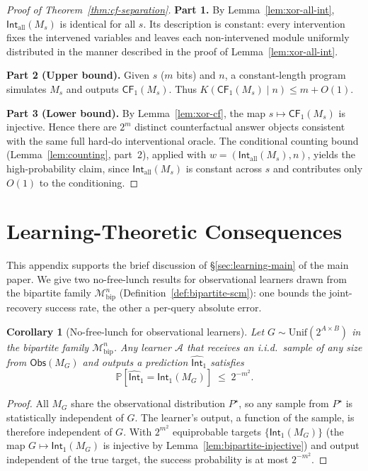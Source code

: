 \documentclass{article}
\theoremstyle{plain}
\newtheorem{corollary}[theorem]{Corollary}
\theoremstyle{definition}
\newcommand{\Prob}{\mathbb{P}}
\newcommand{\calM}{\mathcal{M}}
\newcommand{\calA}{\mathcal{A}}
\newcommand{\Obs}{\mathsf{Obs}}
\newcommand{\Int}{\mathsf{Int}}
\newcommand{\CF}{\mathsf{CF}}
\begin{document}
\begin{proof}[Proof of Theorem~\ref{thm:cf-separation}]
\textbf{Part 1.} By Lemma~\ref{lem:xor-all-int}, $\Int_{\mathrm{all}}(M_s)$ is identical for all $s$. Its description is constant: every intervention fixes the intervened variables and leaves each non-intervened module uniformly distributed in the manner described in the proof of Lemma~\ref{lem:xor-all-int}.

\textbf{Part 2 (Upper bound).} Given $s$ ($m$ bits) and $n$, a constant-length program simulates $M_s$ and outputs $\CF_1(M_s)$. Thus $K(\CF_1(M_s) \mid n) \leq m + O(1)$.

\textbf{Part 3 (Lower bound).} By Lemma~\ref{lem:xor-cf}, the map $s \mapsto \CF_1(M_s)$ is injective. Hence there are $2^m$ distinct counterfactual answer objects consistent with the same full hard-do interventional oracle. The conditional counting bound (Lemma~\ref{lem:counting}, part~2), applied with $w = (\Int_{\mathrm{all}}(M_s), n)$, yields the high-probability claim, since $\Int_{\mathrm{all}}(M_s)$ is constant across $s$ and contributes only $O(1)$ to the conditioning.
\end{proof}

\section{Learning-Theoretic Consequences}
\label{app:learning}

This appendix supports the brief discussion of \S\ref{sec:learning-main} of the main paper. We give two no-free-lunch results for observational learners drawn from the bipartite family $\calM_{\mathrm{bip}}^n$ (Definition~\ref{def:bipartite-scm}): one bounds the joint-recovery success rate, the other a per-query absolute error.

\begin{corollary}[No-free-lunch for observational learners]
\label{cor:no-free-lunch}
Let $G \sim \mathrm{Unif}(2^{A \times B})$ in the bipartite family $\calM_{\mathrm{bip}}^n$. Any learner $\calA$ that receives an i.i.d.\ sample of any size from $\Obs(M_G)$ and outputs a prediction $\widehat{\Int}_1$ satisfies
\[
\Prob[\widehat{\Int}_1 = \Int_1(M_G)] \;\leq\; 2^{-m^2}.
\]
\end{corollary}

\begin{proof}
All $M_G$ share the observational distribution $P^\star$, so any sample from $P^\star$ is statistically independent of $G$. The learner's output, a function of the sample, is therefore independent of $G$. With $2^{m^2}$ equiprobable targets $\{\Int_1(M_G)\}$ (the map $G \mapsto \Int_1(M_G)$ is injective by Lemma~\ref{lem:bipartite-injective}) and output independent of the true target, the success probability is at most $2^{-m^2}$.
\end{proof}
\end{document}
